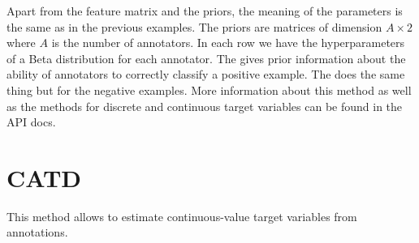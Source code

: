 \documentclass[letterpaper,10pt,english]{sphinxmanual}
\begin{document}
\begin{sphinxVerbatim}[commandchars=\\\{\}]
   \PYG{o}{[}\PYG{o}{]}

   
\end{sphinxVerbatim}

Apart from the feature matrix and the priors, the meaning of the parameters is the same as in the previous examples.
The priors are matrices of dimension $A \times 2$ where $A$ is the number of annotators. In each row we have the hyperparameters of a Beta distribution for each annotator.
The  gives prior information about the ability of annotators to correctly classify a positive example. The
 does the same thing but for the negative examples. More information about this method as well as the methods
for discrete and continuous target variables can be found in the API docs.


\section{CATD}
\label{\detokenize{usage/examples:catd}}
This method allows to estimate continuous-value target variables from annotations.

%
\begin{sphinxVerbatim}[commandchars=\\\{\}]
 
 


   

   \PYG{o}{[}\PYG{o}{]}

    

   

   
\end{sphinxVerbatim}
\end{document}
